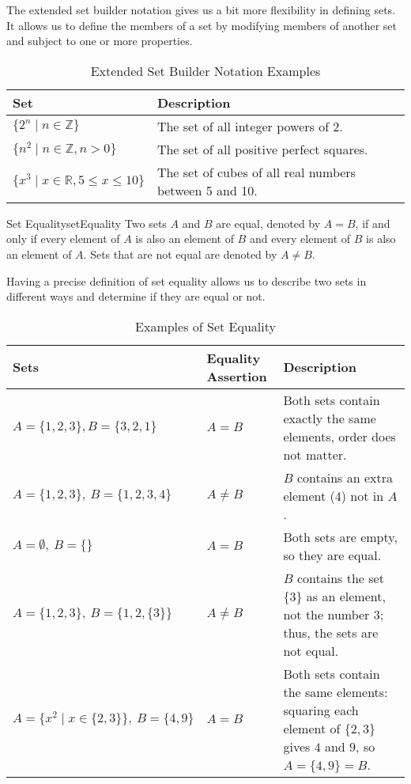 The extended set builder notation gives us a bit more flexibility in defining sets. It allows us
to define the members of a set by modifying members of another set and subject to one
or more properties.

\begin{table}[H]
  \centering
  \begin{tabular}{p{2in} p{3in}}
    \toprule
    \textbf{Set} & \textbf{Description} \\
    \midrule
    \( \{ 2^n \mid n \in \mathbb{Z} \} \) & The set of all integer powers of 2. \\
    \( \{ n^2 \mid n \in \mathbb{Z}, n > 0 \} \) & The set of all positive perfect squares. \\
    \( \{ x^3 \mid x \in \mathbb{R}, 5 \le x \le 10 \} \) &
      The set of cubes of all real numbers between 5 and 10. \\
    \bottomrule
  \end{tabular}
  \caption{Extended Set Builder Notation Examples}
\end{table}

\begin{definition}{Set Equality}{setEquality}
  Two sets \( A \) and \( B \) are equal, denoted by \( A = B \), if and only if
  every element of \( A \) is also an element of \( B \) and every element of \( B \)
  is also an element of \( A \). Sets that are not equal are denoted by \( A \neq B \).
\end{definition}

Having a precise definition of set equality allows us to describe two sets in different
ways and determine if they are equal or not.

\begin{table}[H]
  \centering
  \begin{tabular}{p{2in} p{0.75in} p{2.25in}}
    \toprule
    \textbf{Sets} & \textbf{Equality \newline Assertion} & \textbf{Description} \\
    \midrule
    \( A = \{ 1, 2, 3 \}, B = \{ 3, 2, 1 \} \) & \( A = B \) & Both sets contain exactly the same elements, order does not matter. \\
    \( A = \{ 1, 2, 3 \},\ B = \{ 1, 2, 3, 4 \} \) & \( A \neq B \) & \( B \) contains an extra element (4) not in \( A \). \\
    \( A = \emptyset,\ B = \{ \} \) & \( A = B \) & Both sets are empty, so they are equal. \\
    \( A = \{ 1, 2, 3 \},\ B = \{ 1, 2, \{3\} \} \) & \( A \neq B \) &
      \( B \) contains the set \( \{3\} \) as an element, not the number \( 3 \); thus, the sets are not equal. \\
    \( A = \{ x^2 \mid x \in \{ 2, 3 \} \},\ B = \{ 4, 9 \} \) & \( A = B \) & Both sets contain the same elements: squaring each
      element of \( \{2, 3\} \) gives \( 4 \) and \( 9 \), so \( A = \{4, 9\} = B \). \\
    \bottomrule
  \end{tabular}
  \caption{Examples of Set Equality}
\end{table}